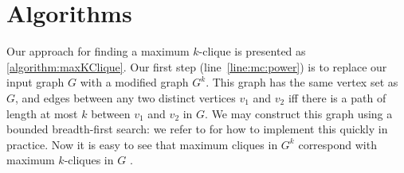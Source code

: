 \documentclass[letterpaper]{article}
\newcommand{\mcline}[1]{line~\ref{line:mc:#1}}
\begin{document}
\section{Algorithms}

Our approach for finding a maximum $k$-clique is presented as \cref{algorithm:maxKClique}. Our first
step (\mcline{power}) is to replace our input graph $G$ with a modified graph $G^k$. This graph has
the same vertex set as $G$, and edges between any two distinct vertices $v_1$ and $v_2$ iff there is
a path of length at most $k$ between $v_1$ and $v_2$ in $G$. We may construct this graph using a
bounded breadth-first search: we refer to \citeauthor{Chang:2013}  for how to
implement this quickly in practice. Now it is easy to see that maximum cliques in $G^k$ correspond
with maximum $k$-cliques in $G$ \cite{Balasundaram:2005}.
\end{document}
